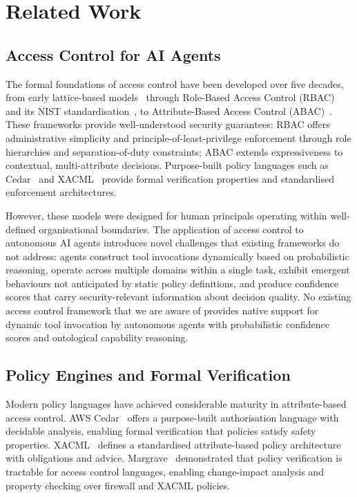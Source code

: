 \documentclass[10pt,a4paper,twocolumn]{article}
\begin{document}
\section{Related Work}
\label{sec:related}

\subsection{Access Control for AI Agents}
\label{sec:access_control}

The formal foundations of access control have been developed over five decades, from early lattice-based models~\cite{bell1973secure} through Role-Based Access Control (RBAC)~\cite{sandhu1996role} and its NIST standardisation~\cite{ferraiolo2001proposed}, to Attribute-Based Access Control (ABAC)~\cite{hu2014guide}. These frameworks provide well-understood security guarantees: RBAC offers administrative simplicity and principle-of-least-privilege enforcement through role hierarchies and separation-of-duty constraints; ABAC extends expressiveness to contextual, multi-attribute decisions. Purpose-built policy languages such as Cedar~\cite{cutler2024cedar} and XACML~\cite{oasis2013xacml} provide formal verification properties and standardised enforcement architectures.

However, these models were designed for human principals operating within well-defined organisational boundaries. The application of access control to autonomous AI agents introduces novel challenges that existing frameworks do not address: agents construct tool invocations dynamically based on probabilistic reasoning, operate across multiple domains within a single task, exhibit emergent behaviours not anticipated by static policy definitions, and produce confidence scores that carry security-relevant information about decision quality. No existing access control framework that we are aware of provides native support for dynamic tool invocation by autonomous agents with probabilistic confidence scores and ontological capability reasoning.

\subsection{Policy Engines and Formal Verification}
\label{sec:policy_engines}

Modern policy languages have achieved considerable maturity in attribute-based access control. AWS Cedar~\cite{cutler2024cedar} offers a purpose-built authorisation language with decidable analysis, enabling formal verification that policies satisfy safety properties. XACML~\cite{oasis2013xacml} defines a standardised attribute-based policy architecture with obligations and advice. Margrave~\cite{fisler2005verification} demonstrated that policy verification is tractable for access control languages, enabling change-impact analysis and property checking over firewall and XACML policies.
\end{document}
